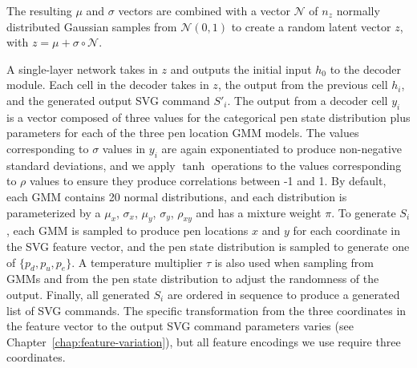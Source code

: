 The resulting $\mu$ and $\sigma$ vectors are combined with a vector $\mathcal{N}$ of $n_z$ normally distributed Gaussian samples from $\mathcal{N}(0,1)$ to create a random latent vector $z$, with $z = \mu + \sigma \circ \mathcal{N}$.

A single-layer network takes in $z$ and outputs the initial input $h_0$ to the decoder module.
Each cell in the decoder takes in $z$, the output from the previous cell $h_i$, and the generated output SVG command $S'_i$.
The output from a decoder cell $y_i$ is a vector composed of three values for the categorical pen state distribution plus parameters for each of the three pen location GMM models.
The values corresponding to $\sigma$ values in $y_i$ are again exponentiated to produce non-negative standard deviations, and we apply $\tanh$ operations to the values corresponding to $\rho$ values to ensure they produce correlations between -1 and 1. 
By default, each GMM contains 20 normal distributions, and each distribution is parameterized by a $\mu_x$, $\sigma_x$, $\mu_y$, $\sigma_y$, $\rho_{xy}$ and has a mixture weight $\pi$.
To generate $S_i$, each GMM is sampled to produce pen locations $x$ and $y$ for each coordinate in the SVG feature vector, and the pen state distribution is sampled to generate one of $\{p_d, p_u, p_e\}$.
A temperature multiplier $\tau$ is also used when sampling from GMMs and from the pen state distribution to adjust the randomness of the output.
Finally, all generated $S_i$ are ordered in sequence to produce a generated list of SVG commands. The specific transformation from the three coordinates in the feature vector to the output SVG command parameters varies (see Chapter~\ref{chap:feature-variation}), but all feature encodings we use require three coordinates. 
